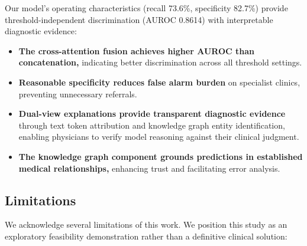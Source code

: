 \documentclass[11pt,onecolumn,a4paper]{article}
\begin{document}
Our model's operating characteristics (recall 73.6\%, specificity 82.7\%) provide threshold-independent discrimination (AUROC 0.8614) with interpretable diagnostic evidence:

\begin{itemize}[leftmargin=*]
    \item \textbf{The cross-attention fusion achieves higher AUROC than concatenation,} indicating better discrimination across all threshold settings.
    \item \textbf{Reasonable specificity reduces false alarm burden} on specialist clinics, preventing unnecessary referrals.
    \item \textbf{Dual-view explanations provide transparent diagnostic evidence} through text token attribution and knowledge graph entity identification, enabling physicians to verify model reasoning against their clinical judgment.
    \item \textbf{The knowledge graph component grounds predictions in established medical relationships,} enhancing trust and facilitating error analysis.
\end{itemize}

\subsection{Limitations}
\label{sec:limitations}

We acknowledge several limitations of this work. We position this study as an exploratory feasibility demonstration rather than a definitive clinical solution:
\end{document}
